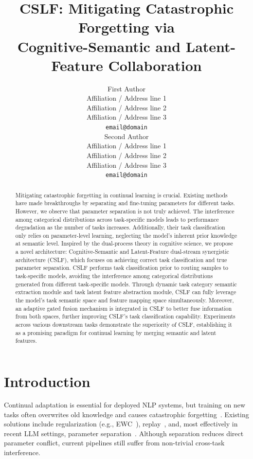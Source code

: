 \documentclass[11pt]{article}
\title{CSLF: Mitigating Catastrophic Forgetting via  \\ Cognitive-Semantic and Latent-Feature Collaboration}
\author{First Author \\
  Affiliation / Address line 1 \\
  Affiliation / Address line 2 \\
  Affiliation / Address line 3 \\
  \texttt{email@domain} \\\And
  Second Author \\
  Affiliation / Address line 1 \\
  Affiliation / Address line 2 \\
  Affiliation / Address line 3 \\
  \texttt{email@domain} \\}
\begin{document}
\maketitle
\begin{abstract}
Mitigating catastrophic forgetting in continual learning is crucial. Existing methods have made breakthroughs by separating and fine-tuning parameters for different tasks. However, we observe that parameter separation is not truly achieved. The interference among categorical distributions across task-specific models leads to performance degradation as the number of tasks increases. Additionally, their task classification only relies on parameter-level learning, neglecting the model's inherent prior knowledge at semantic level. Inspired by the dual-process theory in cognitive science, we propose a novel architecture: Cognitive-Semantic and Latent-Feature dual-stream synergistic architecture (CSLF), which focuses on achieving correct task classification and true parameter separation. CSLF performs task classification prior to routing samples to task-specific models, avoiding the interference among categorical distributions generated from different task-specific models. Through dynamic task category semantic extraction module and task latent feature abstraction module, CSLF can fully leverage the model's task semantic space and feature mapping space simultaneously. Moreover, an adaptive gated fusion mechanism is integrated in CSLF to better fuse information from both spaces, further improving CSLF's task classification capability. Experiments across various downstream tasks demonstrate the superiority of CSLF, establishing it as a promising paradigm for continual learning by merging semantic and latent features.

\end{abstract}
\section{Introduction}

Continual adaptation is essential for deployed NLP systems, but training on new tasks often overwrites old knowledge and causes catastrophic forgetting~\cite{1,2,3}. Existing solutions include regularization (e.g., EWC~\cite{ewc_2017}), replay~\cite{mem_2022}, and, most effectively in recent LLM settings, parameter separation~\cite{lora,lester2021power,li2021prefix,pre_2024_cor,pre_2022_3}. Although separation reduces direct parameter conflict, current pipelines still suffer from non-trivial cross-task interference.
\end{document}
